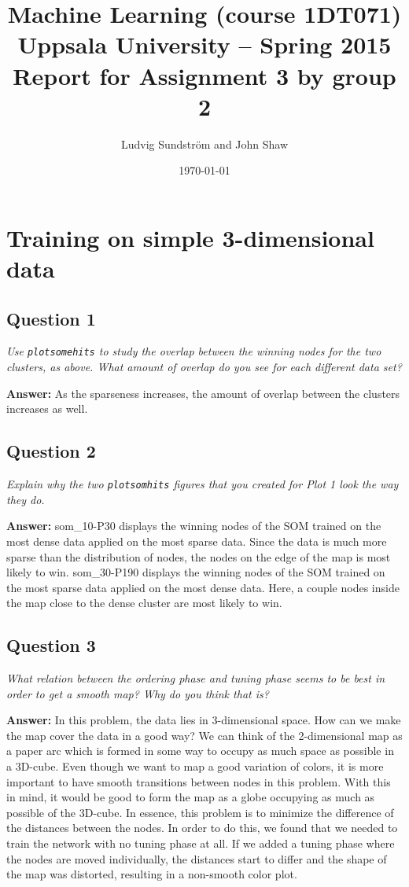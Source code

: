 \documentclass[a4paper]{article}
\title{Machine Learning (course 1DT071)
Uppsala University – Spring 2015
Report for Assignment 3 by group 2}
\author{Ludvig Sundstr\"{o}m and John Shaw}
\date{\today}
\begin{document}
\maketitle

\section{Training on simple 3-dimensional data}

\subsection*{Question 1} 
\emph{Use \texttt{plotsomehits} to study the overlap between the winning nodes for the two clusters, as above. What amount of overlap do you see for each different data set?}

\textbf{Answer:} As the sparseness increases, the amount of overlap between the clusters increases as well.


\subsection*{Question 2}
\emph{Explain why the two \texttt{plotsomhits} figures that you created for Plot 1 look the way they do.}

\textbf{Answer:} som\_10-P30 displays the winning nodes of the SOM trained on the most dense data applied on the most sparse data. Since the data is much more sparse than the distribution of nodes, the nodes on the edge of the map is most likely to win. som\_30-P190 displays the winning nodes of the SOM trained on the most sparse data applied on the most dense data. Here, a couple nodes inside the map close to the dense cluster are most likely to win. 


\subsection*{Question 3}
\emph{What relation between the ordering phase and tuning phase seems to be best in order to get a smooth map? Why do you think that is?}

\textbf{Answer:} 
In this problem, the data lies in 3-dimensional space. How can we make the map cover the data in a good way? We can think of the 2-dimensional map as a paper arc which is formed  in some way to occupy as much space as possible in a 3D-cube. Even though we want to map a good variation of colors, it is more important to have smooth transitions between nodes in this problem. With this in mind, it would be good to form the map as a globe occupying as much as possible of the 3D-cube. In essence, this problem is to minimize the difference of the distances between the nodes. In order to do this, we found that we needed to train the network with no tuning phase at all. If we added a tuning phase where the nodes are moved individually, the distances start to differ and the shape of the map was distorted, resulting in a non-smooth color plot.
\end{document}
